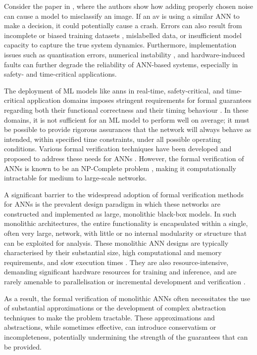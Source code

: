 Consider the paper in \cite{goodfellow_explaining_2015}, where the authors show how adding properly chosen noise can cause a model to misclassify an image. If an  \gls{av} is using a similar ANN to make a decision, it could potentially cause a crash. Errors can also result from incomplete or biased training datasets \cite{torralba_unbiased_2011}, mislabelled data, or insufficient model capacity to capture the true system dynamics. Furthermore, implementation issues such as quantisation errors, numerical instability \cite{sze_efficient_2017}, and hardware-induced faults can further degrade the reliability of ANN-based systems, especially in safety- and time-critical applications.

The deployment of ML models like \glspl{ann} in real-time, safety-critical, and time-critical application domains imposes stringent requirements for formal guarantees regarding both their functional correctness \cite{clarke_jr_model_2018} and their timing behaviour \cite{mitra_time-critical_2018}. In these domains, it is not sufficient for an ML model to perform well on average; it must be possible to provide rigorous assurances that the network will always behave as intended, within specified time constraints, under all possible operating conditions. Various formal verification techniques have been developed and proposed to address these needs for ANNs \cite{woodcock_formal_2009}. However, the formal verification of ANNs is known to be an NP-Complete problem \cite{katz_reluplex_2017}, making it computationally intractable for medium to large-scale networks.

A significant barrier to the widespread adoption of formal verification methods for ANNs is the prevalent design paradigm in which these networks are constructed and implemented as large, monolithic black-box \cite{yang_compositional_2020} models. In such monolithic architectures, the entire functionality is encapsulated within a single, often very large, network, with little or no internal modularity or structure that can be exploited for analysis. These monolithic ANN designs are typically characterised by their substantial size, high computational and memory requirements, and slow execution times \cite{yang_compositional_2020}. They are also resource-intensive, demanding significant hardware resources for training and inference, and are rarely amenable to parallelisation or incremental development and verification \cite{tripakis_compositionality_2016}.

As a result, the formal verification of monolithic ANNs often necessitates the use of substantial approximations \cite{ehlers_formal_2017} or the development of complex abstraction techniques \cite{gehr_ai2_2018} to make the problem tractable. These approximations and abstractions, while sometimes effective, can introduce conservatism or incompleteness, potentially undermining the strength of the guarantees that can be provided. 

